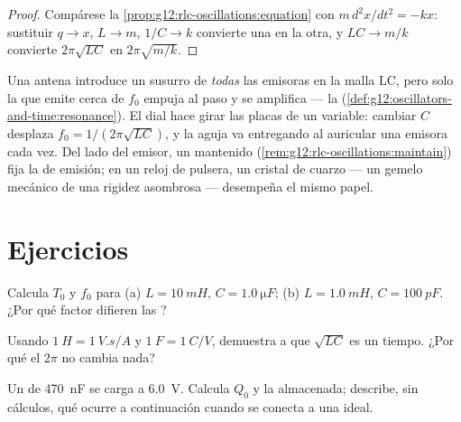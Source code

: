 \begin{proof}
Compárese la \cref{prop:g12:rlc-oscillations:equation} con $m\,d^2x/dt^2 = -kx$:
sustituir $q \to x$, $L \to m$, $1/C \to k$ convierte una en la otra, y $LC \to m/k$
convierte $2\pi\sqrt{LC}$ en $2\pi\sqrt{m/k}$.
\end{proof}

\begin{example}\label{ex:g12:rlc-oscillations:tuning}
Una antena introduce un susurro de \emph{todas} las emisoras en la malla LC, pero solo
la que emite cerca de $f_0$ empuja al paso y se amplifica --- la 
(\cref{def:g12:oscillators-and-time:resonance}). El dial hace girar las placas de un
 variable: cambiar $C$ desplaza $f_0 = 1/(2\pi\sqrt{LC})$, y la aguja va
entregando al auricular una emisora cada vez. Del lado del emisor, un 
mantenido (\cref{rem:g12:rlc-oscillations:maintain}) fija la  de emisión; en
un reloj de pulsera, un cristal de cuarzo --- un gemelo mecánico de una rigidez
asombrosa --- desempeña el mismo papel.
\end{example}

\section{Ejercicios}

\begin{exercise}[$\star$]\label{exo:g12:rlc-oscillations:1}
Calcula $T_0$ y $f_0$ para (a) $L = \qty{10}{mH}$, $C = \qty{1.0}{\micro F}$;
(b) $L = \qty{1.0}{mH}$, $C = \qty{100}{pF}$. ¿Por qué factor difieren las
?
\end{exercise}

\begin{exercise}[$\star$]\label{exo:g12:rlc-oscillations:2}
Usando $\qty{1}{H} = \qty{1}{V.s/A}$ y $\qty{1}{F} = \qty{1}{C/V}$, demuestra  a
 que $\sqrt{LC}$ es un tiempo. ¿Por qué el $2\pi$ no cambia nada?
\end{exercise}

\begin{exercise}[$\star$]\label{exo:g12:rlc-oscillations:3}
Un  de \qty{470}{nF} se carga a \qty{6.0}{V}. Calcula $Q_0$ y la 
almacenada; describe, sin cálculos, qué ocurre a continuación cuando se conecta a una
 ideal.
\end{exercise}

